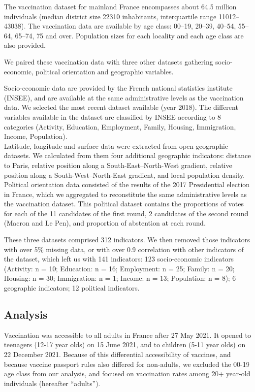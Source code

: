 \documentclass[
]{article}
\begin{document}
The vaccination dataset for mainland France encompasses about 64.5
million individuals (median district size 22310 inhabitants,
interquartile range 11012--43038). The vaccination data are available by
age class: 00--19, 20--39, 40--54, 55--64, 65--74, 75 and over.
Population sizes for each locality and each age class are also provided.

We paired these vaccination data with three other datasets gathering
socio-economic, political orientation and geographic variables.

Socio-economic data are provided by the French national statistics
institute (INSEE), and are available at the same administrative levels
as the vaccination data. We selected the most recent dataset available
(year 2018). The different variables available in the dataset are
classified by INSEE according to 8 categories (Activity, Education,
Employment, Family, Housing, Immigration, Income, Population).\\
Latitude, longitude and surface data were extracted from open geographic
datasets. We calculated from them four additional geographic indicators:
distance to Paris, relative position along a South-East--North-West
gradient, relative position along a South-West--North-East gradient, and
local population density.\\
Political orientation data consisted of the results of the 2017
Presidential election in France, which we aggregated to reconstitute the
same administrative levels as the vaccination dataset. This political
dataset contains the proportions of votes for each of the 11 candidates
of the first round, 2 candidates of the second round (Macron and Le
Pen), and proportion of abstention at each round.

These three datasets comprised 312 indicators. We then removed those
indicators with over 5\% missing data, or with over 0.9 correlation with
other indicators of the dataset, which left us with 141 indicators: 123
socio-economic indicators (Activity: n = 10; Education: n = 16;
Employment: n = 25; Family: n = 20; Housing: n = 30; Immigration: n = 1;
Income: n = 13; Population: n = 8); 6 geographic indicators; 12
political indicators.

\hypertarget{analysis}{%
\subsection{Analysis}\label{analysis}}

Vaccination was accessible to all adults in France after 27 May 2021. It
opened to teenagers (12-17 year olds) on 15 June 2021, and to children
(5-11 year olds) on 22 December 2021. Because of this differential
accessibility of vaccines, and because vaccine passport rules also
differed for non-adults, we excluded the 00-19 age class from our
analysis, and focused on vaccination rates among 20+ year-old
individuals (hereafter ``adults'').
\end{document}
